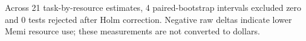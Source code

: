 Across 21 task-by-resource estimates, 4 paired-bootstrap intervals excluded zero and 0 tests rejected after Holm correction. Negative raw deltas indicate lower Memi resource use; these measurements are not converted to dollars.
